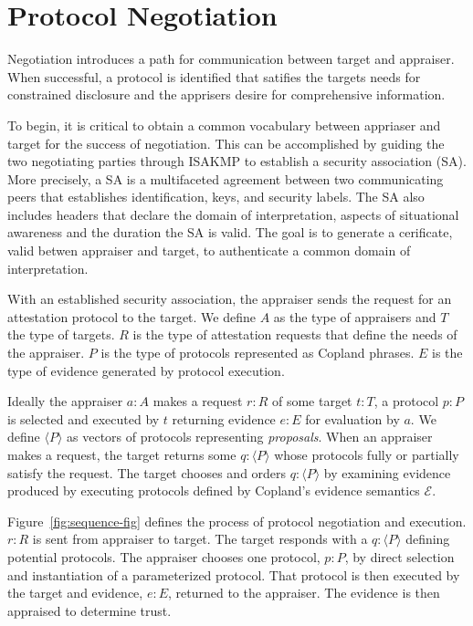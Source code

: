 \documentclass[sigconf,authordraft]{acmart}
\begin{document}

\section{Protocol Negotiation}

Negotiation introduces a path for
communication between target and appraiser. When successful, a protocol is identified
that satifies the targets needs for constrained disclosure and the
apprisers desire for comprehensive information.

To begin, it is critical to obtain a common vocabulary between appriaser and target for the success of negotiation. This can be accomplished by guiding the two negotiating parties through ISAKMP to establish a security association (SA).  More precisely,
a SA is a multifaceted agreement between two communicating peers that
establishes identification, keys, and security labels. The SA also
includes headers that declare the domain of interpretation, aspects of 
situational awareness and the duration the SA is valid. The goal is to generate a  cerificate, valid betwen appraiser and target, to
authenticate a common domain of interpretation.

With an established security association, the appraiser sends the request for an attestation protocol to the target.  We
define $A$ as the type of appraisers and $T$ the type of targets.  $R$
is the type of attestation requests that define the needs of the
appraiser.  $P$ is the type of protocols represented as Copland
phrases.  $E$ is the type of evidence generated by protocol execution.

Ideally the appraiser $a:A$ makes a request $r:R$ of some target
$t:T$, a protocol $p:P$ is selected and executed by $t$ returning
evidence $e:E$ for evaluation by $a$. We define $\langle P \rangle$ as
vectors of protocols representing \emph{proposals}.  When an appraiser
makes a request, the target returns some $q:\langle P \rangle$ whose
protocols fully or partially satisfy the request. The target chooses
and orders $q:\langle P\rangle$ by examining evidence produced by
executing protocols defined by Copland's evidence semantics
$\mathcal{E}$.

Figure~\ref{fig:sequence-fig} defines the process of protocol
negotiation and execution.  $r:R$ is sent from appraiser to target.
The target responds with a $q:\langle P\rangle$ defining potential
protocols.  The appraiser chooses one protocol, $p:P$, by direct
selection and instantiation of a parameterized protocol.  That
protocol is then executed by the target and evidence, $e:E$, returned
to the appraiser.  The evidence is then appraised to determine trust.
\end{document}

